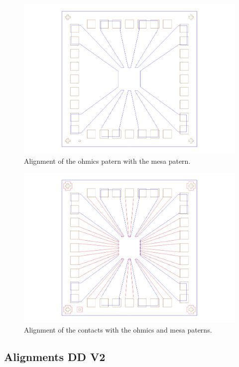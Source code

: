 \begin{figure} [h] \centering
\includegraphics[scale=0.3]{fig/align1.pdf}
\caption{Alignment of the ohmics patern with the mesa patern.} \label{align1}
\end{figure}

\begin{figure} [h] \centering
\includegraphics[scale=0.3]{fig/align2.pdf}
\caption{Alignment of the contacts with the ohmics and mesa paterns.} \label{align2}
\end{figure}

\newpage

\subsection{Alignments DD V2}


